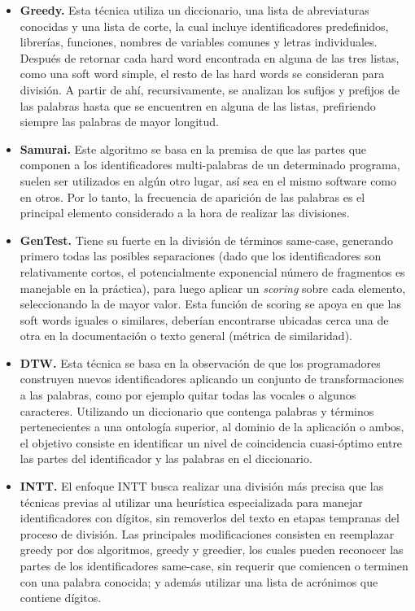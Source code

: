 \begin{itemize}
  \item \textbf{Greedy.} Esta técnica utiliza un diccionario, una lista de abreviaturas conocidas y una lista de corte, la cual incluye identificadores predefinidos, librerías, funciones, nombres de variables comunes y letras individuales.
Después de retornar cada hard word encontrada en alguna de las tres listas, como una soft word simple, el resto de las hard words se consideran para división.
A partir de ahí, recursivamente, se analizan los sufijos y prefijos de las palabras hasta que se encuentren en alguna de las listas, prefiriendo siempre las palabras de mayor longitud.
  
  \item \textbf{Samurai.} Este algoritmo se basa en la premisa de que las partes que componen a los identificadores multi-palabras de un determinado programa, suelen ser utilizados en algún otro lugar, así sea en el mismo software como en otros.
Por lo tanto, la frecuencia de aparición de las palabras es el principal elemento considerado a la hora de realizar las divisiones.
  
  \item \textbf{GenTest.} Tiene su fuerte en la división de términos same-case, generando primero todas las posibles separaciones (dado que los identificadores son relativamente cortos, el potencialmente exponencial número de fragmentos es manejable en la práctica), para luego aplicar un \textit{scoring} sobre cada elemento, seleccionando la de mayor valor.
Esta función de scoring se apoya en que las soft words iguales o similares, deberían encontrarse ubicadas cerca una de otra en la documentación o texto general (métrica de similaridad). 
  
  \item \textbf{DTW.} Esta técnica se basa en la observación de que los programadores construyen nuevos identificadores aplicando un conjunto de transformaciones a las palabras, como por ejemplo quitar todas las vocales o algunos caracteres.
Utilizando un diccionario que contenga palabras y términos pertenecientes a una ontología superior, al dominio de la aplicación o ambos, el objetivo consiste en identificar un nivel de coincidencia cuasi-óptimo entre las partes del identificador y las palabras en el diccionario.
  
  \item \textbf{INTT.} El enfoque INTT busca realizar una división más precisa que las técnicas previas al utilizar una heurística especializada para manejar identificadores con dígitos, sin removerlos del texto en etapas tempranas del proceso de división.
Las principales modificaciones consisten en reemplazar greedy por dos algoritmos, greedy y greedier, los cuales pueden reconocer las partes de los identificadores same-case, sin requerir que comiencen o terminen con una palabra conocida; y además utilizar una lista de acrónimos que contiene dígitos.
\end{itemize}

